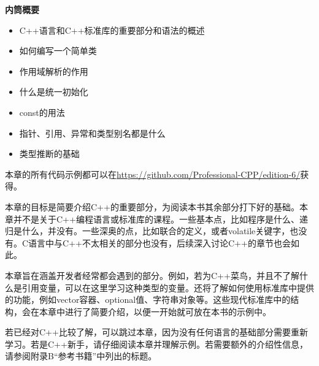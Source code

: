 
\noindent
\textbf{内筒概要}

\begin{itemize}
\item
C++语言和C++标准库的重要部分和语法的概述

\item
如何编写一个简单类

\item
作用域解析的作用

\item
什么是统一初始化

\item
const的用法

\item
指针、引用、异常和类型别名都是什么

\item
类型推断的基础
\end{itemize}

本章的所有代码示例都可以在\url{https://github.com/Professional-CPP/edition-6/}获得。

本章的目标是简要介绍C++的重要部分，为阅读本书其余部分打下好的基础。本章并不是关于C++编程语言或标准库的课程。一些基本点，比如程序是什么、递归是什么，并没有。一些深奥的点，比如联合的定义，或者volatile关键字，也没有。C语言中与C++不太相关的部分也没有，后续深入讨论C++的章节也会如此。

本章旨在涵盖开发者经常都会遇到的部分。例如，若为C++菜鸟，并且不了解什么是引用变量，可以在这里学习这种类型的变量。还将了解如何使用标准库中提供的功能，例如vector容器、optional值、字符串对象等。这些现代标准库中的结构，会在本章中进行了简要介绍，以便一开始就可放在本书的示例中。

若已经对C++比较了解，可以跳过本章，因为没有任何语言的基础部分需要重新学习。若是C++新手，请仔细阅读本章并理解示例。若需要额外的介绍性信息，请参阅附录B“参考书籍”中列出的标题。








